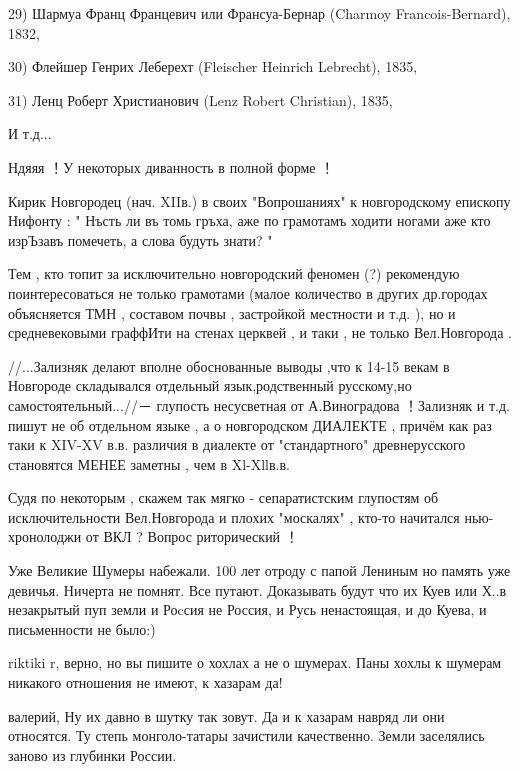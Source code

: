 \begin{itemize}
29) Шармуа Франц Францевич или Франсуа-Бернар (Charmoy Francois-Bernard), 1832,

30) Флейшер Генрих Леберехт (Fleischer Heinrich Lebrecht), 1835,

31) Ленц Роберт Христианович (Lenz Robert Christian), 1835,

И т.д...


Ндяяя ！У некоторых диванность в полной форме ！

Кирик Новгородец (нач. XIIв.) в своих "Вопрошаниях" к новгородскому епископу
Нифонту : " Нъсть ли въ томь гръха, аже по грамотамъ ходити ногами аже кто
изрЪзавъ помечеть, а слова будуть знати? "

Тем , кто топит за исключительно новгородский феномен (?) рекомендую
поинтересоваться не только грамотами (малое количество в других др.городах
объясняется ТМН , составом почвы , застройкой местности и т.д. ), но и
средневековыми граффИти на стенах церквей , и таки , не только Вел.Новгорода .

//...Зализняк делают вполне обоснованные выводы ,что к 14-15 векам в Новгороде
складывался отдельный язык,родственный русскому,но самостоятельный...//－
глупость несусветная от А.Виноградова ！Зализняк и т.д. пишут не об отдельном
языке , а о новгородском ДИАЛЕКТЕ , причём как раз таки к XIV-XV в.в. различия
в диалекте от "стандартного" древнерусского становятся МЕНЕЕ заметны , чем в
Xl-Xllв.в.

Судя по некоторым , скажем так мягко - сепаратистским глупостям об
исключительности Вел.Новгорода и плохих "москалях" , кто-то начитался
нью-хронолоджи от ВКЛ ? Вопрос риторический ！


Уже Великие Шумеры набежали. 100 лет отроду с папой Лениным но память уже
девичья. Ничерта не помнят. Все путают. Доказывать будут что их Куев или Х..в
незакрытый пуп земли и Роcсия не Россия, и Русь ненастоящая, и до Куева, и
письменности не было:)


riktiki r, верно, но вы пишите о хохлах а не о шумерах. Паны хохлы к шумерам
никакого отношения не имеют, к хазарам да!


валерий, Ну их давно в шутку так зовут. Да и к хазарам навряд ли они относятся.
Ту степь монголо-татары зачистили качественно. Земли заселялись заново из
глубинки России.


\end{itemize}
